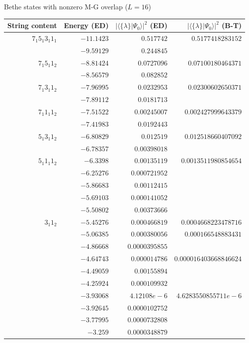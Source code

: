 \documentclass[11pt]{iopart}
\begin{document}
\begin{table}[h]
\scriptsize
\centering
Bethe states with nonzero M-G overlap ($L=16$)\\[1ex]
\begin{tabular}{rrrr}
String content & Energy (ED) & $|\langle \{\lambda\}| \Psi_0 \rangle|^2$ (ED) & $|\langle \{\lambda\}| \Psi_0 \rangle|^2$ (B-T) \\[0.3em]
\toprule
$7_1 5_1 3_1 1_1$ & $-11.1423$ & $0.517742$         & $0.5177418283152$\\
& $-9.59129$ & $0.244845$         &\\
$7_1 5_1 1_2$ & $-8.81424$ & $0.0727096$        & $0.07100180464371$\\
& $-8.56579$ & $0.082852$         &\\
$7_1 3_1 1_2$ & $-7.96995$ & $0.0232953$        & $0.02300602650371$\\
& $-7.89112$  & $0.0181713$        &\\
$7_1 1_1 1_2$ & $-7.51522$ & $0.00245007$       & $0.002427999643379$\\
& $-7.41983$ & $0.0192443$        &\\
$5_1 3_1 1_2$ & $-6.80829$ & $0.012519$         & $0.012518660407092$\\
& $-6.78357$ & $0.00398018$       &\\
$5_1 1_1 1_2$ & $-6.3398$  &  $0.00135119$      & $0.0013511980854654$\\
& $-6.25276$ & $0.000721952$      &\\
& $-5.86683$ & $0.00112415$       &\\
& $-5.69103$ & $0.000141052$      &\\
& $-5.50802$ & $0.00373666$       &\\
$3_1 1_2$ & $-5.45276$ & $0.000466819$      & $0.0004668223478716$\\
& $-5.06385$ & $0.000380056$      & $0.000166548883431$\\
& $-4.86668$ & $0.0000395855$     &\\
& $-4.64743$ & $0.000014786$      & $0.000016403668846624$\\
& $-4.49059$ & $0.00155894$       &\\
& $-4.25924$ & $0.000109932$      &\\
& $-3.93068$ & $4.12108e-6$       & $4.6283550855711e-6$\\
& $-3.92645$ & $0.0000102752$     &\\
& $-3.77995$ & $0.0000732808$     &\\
& $-3.259$   & $0.0000348879$     &\\

\end{tabular}
\end{table}
\end{document}
